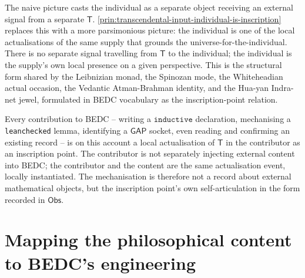 \begin{remark}
\label{rem:transcendental-input-not-receiver-but-actuality}
The naive picture casts the individual as a separate object receiving an external signal from a separate $\mathsf{T}$. \autoref{prin:transcendental-input-individual-is-inscription} replaces this with a more parsimonious picture: the individual is one of the local actualisations of the same supply that grounds the universe-for-the-individual. There is no separate signal travelling from $\mathsf{T}$ to the individual; the individual is the supply's own local presence on a given perspective. This is the structural form shared by the Leibnizian monad, the Spinozan mode, the Whiteheadian actual occasion, the Vedantic Atman-Brahman identity, and the Hua-yan Indra-net jewel, formulated in BEDC vocabulary as the inscription-point relation.
\end{remark}

\begin{example}
\label{ex:transcendental-input-bedc-inscription-event}
Every contribution to BEDC -- writing a $\texttt{inductive}$ declaration, mechanising a \texttt{leanchecked} lemma, identifying a $\mathsf{GAP}$ socket, even reading and confirming an existing record -- is on this account a local actualisation of $\mathsf{T}$ in the contributor as an inscription point. The contributor is not separately injecting external content into BEDC; the contributor and the content are the same actualisation event, locally instantiated. The mechanisation is therefore not a record about external mathematical objects, but the inscription point's own self-articulation in the form recorded in $\mathsf{Obs}$.
\end{example}

\section{Mapping the philosophical content to BEDC's engineering}
\label{sec:transcendental-input-mapping-engineering}

